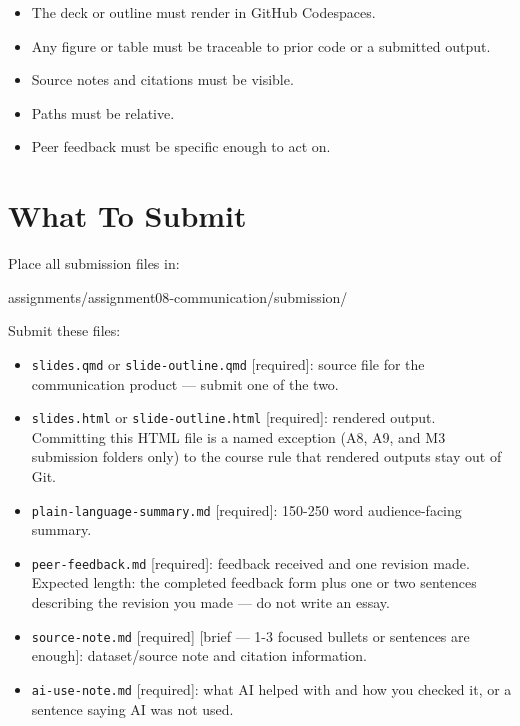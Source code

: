 \documentclass[
  letterpaper,
  DIV=11,
  numbers=noendperiod,
  oneside]{scrreprt}
\newenvironment{Shaded}{\begin{snugshade}}{\end{snugshade}}
\newcommand{\NormalTok}[1]{\textcolor[rgb]{0.00,0.23,0.31}{#1}}
\providecommand{\tightlist}{%
  \setlength{\itemsep}{0pt}\setlength{\parskip}{0pt}}
\begin{document}
\begin{itemize}
\tightlist
\item
  The deck or outline must render in GitHub Codespaces.
\item
  Any figure or table must be traceable to prior code or a submitted
  output.
\item
  Source notes and citations must be visible.
\item
  Paths must be relative.
\item
  Peer feedback must be specific enough to act on.
\end{itemize}

\section{What To Submit}\label{what-to-submit-7}

Place all submission files in:

\begin{Shaded}
\begin{Highlighting}[numbers=left,,]
\NormalTok{assignments/assignment08{-}communication/submission/}
\end{Highlighting}
\end{Shaded}

Submit these files:

\begin{itemize}
\tightlist
\item
  \texttt{slides.qmd} or \texttt{slide-outline.qmd} {[}required{]}:
  source file for the communication product --- submit one of the two.
\item
  \texttt{slides.html} or \texttt{slide-outline.html} {[}required{]}:
  rendered output. Committing this HTML file is a named exception (A8,
  A9, and M3 submission folders only) to the course rule that rendered
  outputs stay out of Git.
\item
  \texttt{plain-language-summary.md} {[}required{]}: 150-250 word
  audience-facing summary.
\item
  \texttt{peer-feedback.md} {[}required{]}: feedback received and one
  revision made. Expected length: the completed feedback form plus one
  or two sentences describing the revision you made --- do not write an
  essay.
\item
  \texttt{source-note.md} {[}required{]} {[}brief --- 1-3 focused
  bullets or sentences are enough{]}: dataset/source note and citation
  information.
\item
  \texttt{ai-use-note.md} {[}required{]}: what AI helped with and how
  you checked it, or a sentence saying AI was not used.
\end{itemize}
\end{document}
